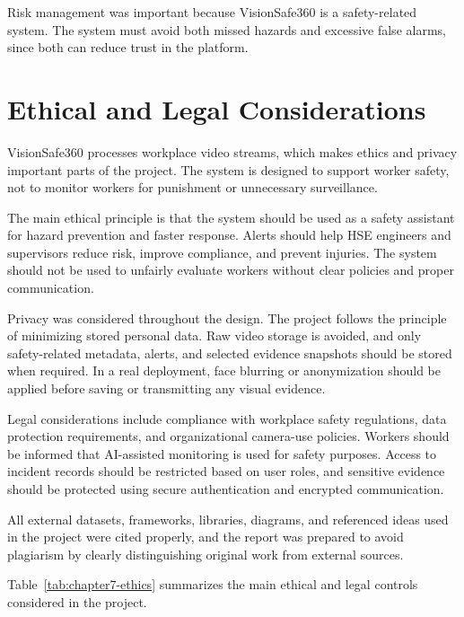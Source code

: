 Risk management was important because VisionSafe360 is a safety-related system. The system must avoid both missed hazards and excessive false alarms, since both can reduce trust in the platform.

\section{Ethical and Legal Considerations}

VisionSafe360 processes workplace video streams, which makes ethics and privacy important parts of the project. The system is designed to support worker safety, not to monitor workers for punishment or unnecessary surveillance.

The main ethical principle is that the system should be used as a safety assistant for hazard prevention and faster response. Alerts should help HSE engineers and supervisors reduce risk, improve compliance, and prevent injuries. The system should not be used to unfairly evaluate workers without clear policies and proper communication.

Privacy was considered throughout the design. The project follows the principle of minimizing stored personal data. Raw video storage is avoided, and only safety-related metadata, alerts, and selected evidence snapshots should be stored when required. In a real deployment, face blurring or anonymization should be applied before saving or transmitting any visual evidence.

Legal considerations include compliance with workplace safety regulations, data protection requirements, and organizational camera-use policies. Workers should be informed that AI-assisted monitoring is used for safety purposes. Access to incident records should be restricted based on user roles, and sensitive evidence should be protected using secure authentication and encrypted communication.

All external datasets, frameworks, libraries, diagrams, and referenced ideas used in the project were cited properly, and the report was prepared to avoid plagiarism by clearly distinguishing original work from external sources.

Table~\ref{tab:chapter7-ethics} summarizes the main ethical and legal controls considered in the project.

